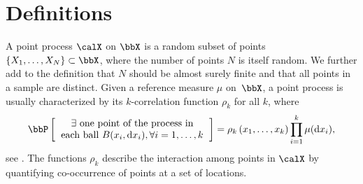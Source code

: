 \documentclass[twoside,11pt]{article}
\begin{document}

    \section{Definitions} %
    \label{sec:definitions}

        A point process $\calX$ on $\bbX$ is a random subset of points $\lrcb{X_1, \dots, X_N} \subset \bbX$, where the number of points $N$ is itself random.
        We further add to the definition that $N$ should be almost surely finite and that all points in a sample are distinct.
        Given a reference measure $\mu$ on~$\bbX$, a point process is usually characterized by its $k$-correlation function $\rho_k$ for all $k$, where
        \begin{equation*}
        \label{eq:correlation_function_intuition}
            \Proba{
                \begin{tabular}{c}
                    $\exists$ one point of the process in\\
                    each ball $B(x_i, \diff x_i), \forall i=1,\dots, k $
                \end{tabular}
            }
            = \rho_k\lrp{x_1,\dots,x_k}
                \prod_{i=1}^k \mu(\diff x_i),
        \end{equation*}
        see \citet[Section 4]{MoWa04}.
        The functions $\rho_k$ describe the interaction among points in $\calX$ by quantifying co-occurrence of points at a set of locations.

\end{document}
